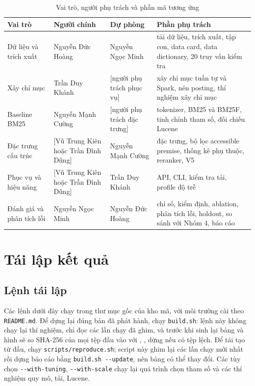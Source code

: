 \documentclass[11pt,a4paper,oneside]{report}
\newcommand{\code}[1]{\texttt{#1}}
\newcommand{\canchot}[1]{\textcolor{red!70!black}{[#1]}}
\begin{document}
\begin{table}[H]
\centering
\caption{Vai trò, người phụ trách và phần mã tương ứng}\label{tab:roles}
\small
\begin{tabularx}{\linewidth}{@{}>{\raggedright\arraybackslash}p{2.6cm}>{\raggedright\arraybackslash}p{3.3cm}>{\raggedright\arraybackslash}p{3.3cm}X@{}}
\toprule
Vai trò & Người chính & Dự phòng & Phần phụ trách \\
\midrule
Dữ liệu và trích xuất & Nguyễn Đức Hoàng & Nguyễn Ngọc Minh & tải dữ liệu, trích xuất, tập con, data card, data dictionary, 20 truy vấn kiểm tra \\
Xây chỉ mục & Trần Duy Khánh & \canchot{người phụ trách phục vụ} & xây chỉ mục tuần tự và Spark, nén posting, thí nghiệm xây chỉ mục \\
Baseline BM25 & Nguyễn Mạnh Cường & \canchot{người phụ trách đặc trưng} & tokenizer, BM25 và BM25F, tinh chỉnh tham số, đối chiếu Lucene \\
Đặc trưng cấu trúc & \canchot{Vũ Trung Kiên hoặc Trần Đình Dũng} & Nguyễn Mạnh Cường & đặc trưng, bộ lọc accessible premise, thống kê phụ thuộc, reranker, V5 \\
Phục vụ và hiệu năng & \canchot{Vũ Trung Kiên hoặc Trần Đình Dũng} & Trần Duy Khánh & API, CLI, kiểm tra tải, profile độ trễ \\
Đánh giá và phân tích lỗi & Nguyễn Ngọc Minh & Nguyễn Đức Hoàng & chỉ số, kiểm định, ablation, phân tích lỗi, holdout, so sánh với Nhóm 4, báo cáo \\
\bottomrule
\end{tabularx}
\end{table}

\chapter{Tái lập kết quả}\label{app:reproduce}

\section{Lệnh tái lập}\label{app:repro}

Các lệnh dưới đây chạy trong thư mục gốc của kho mã, với môi trường cài theo \code{README.md}. Để dựng lại đúng bản đã
phát hành, chạy \code{build.sh}: lệnh này không chạy lại thí nghiệm, chỉ đọc các lần chạy đã ghim, và trước khi sinh lại bảng
và hình sẽ so SHA-256 của mọi tệp đầu vào với , , dừng nếu có tệp lệch. Để
tái tạo từ đầu, chạy \code{scripts/reproduce.sh}; script này ghim lại các lần chạy mới nhất rồi dựng báo cáo bằng
\code{build.sh -{}-update}, nên bảng có thể thay đổi. Các tùy chọn \code{-{}-with-tuning}, \code{-{}-with-scale} chạy lại quá
trình chọn tham số và các thí nghiệm quy mô, tải, Lucene.
\end{document}

